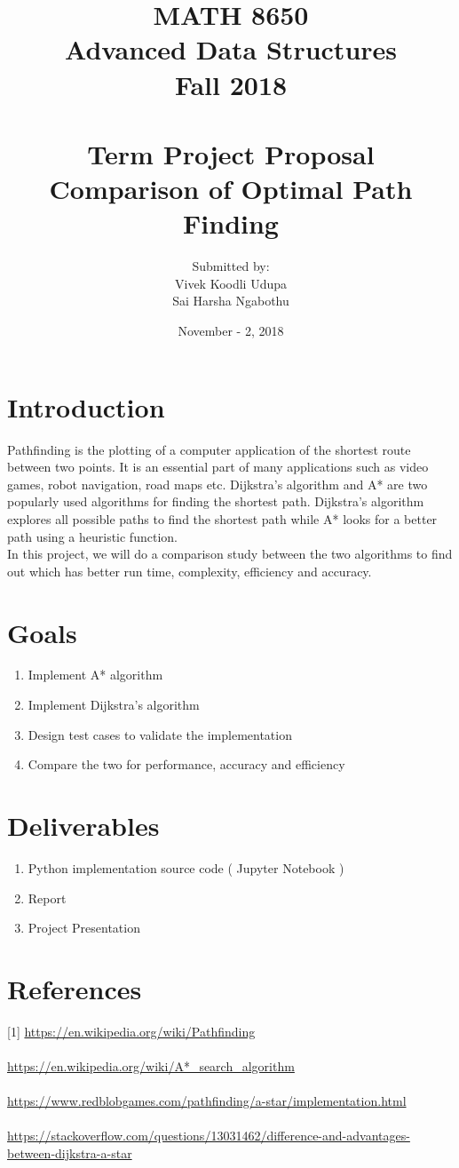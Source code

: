 \documentclass[12pt]{article}
\title{MATH 8650 \\ Advanced Data Structures \\ Fall 2018\\ \quad \\
	Term Project Proposal \\ Comparison of Optimal Path Finding}
\author{Submitted by: 
\\ Vivek Koodli Udupa 
\\ Sai Harsha Ngabothu}
\date{November - 2, 2018 }
\begin{document}
\begin{mdframed}
\maketitle
\end{mdframed}

\section{Introduction}
Pathfinding is the plotting of a computer application of the shortest route between two points. It is an essential part of many applications such as video games, robot navigation, road maps etc. Dijkstra's algorithm and A* are two popularly used algorithms for finding the shortest path. Dijkstra's algorithm explores all possible paths to find the shortest path while A* looks for a better path using a heuristic function. \\
In this project, we will do a comparison study between the two algorithms to find out which has better run time, complexity, efficiency and accuracy. 
\section{Goals}
\begin{enumerate}
	\item Implement A* algorithm
	\item Implement Dijkstra's algorithm
	\item Design test cases to validate the implementation
	\item Compare the two for performance, accuracy and efficiency
\end{enumerate}

\section{Deliverables}
\begin{enumerate}
	\item Python implementation source code ( Jupyter Notebook )
	\item Report
	\item Project Presentation
\end{enumerate}

\section{References}
[1] \url{https://en.wikipedia.org/wiki/Pathfinding} \\
\\ \noindent 
[2] \url{https://en.wikipedia.org/wiki/A*_search_algorithm} \\
\\ \noindent
[3] \url{https://www.redblobgames.com/pathfinding/a-star/implementation.html} \\
\\ \noindent
[4] \url{https://stackoverflow.com/questions/13031462/difference-and-advantages-between-dijkstra-a-star}
\end{document}
